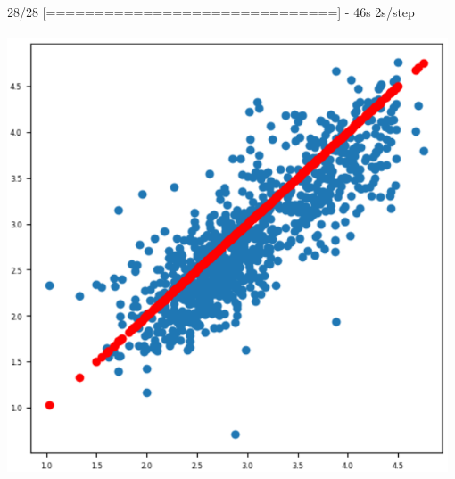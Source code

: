 \documentclass{article}
\begin{document}
28/28 [==============================] - 46s 2s/step\\
[<matplotlib.lines.Line2D at 0x1b9a80ec890>]\\
\includegraphics[width=0.98\textwidth]{5.png}
\end{document}

